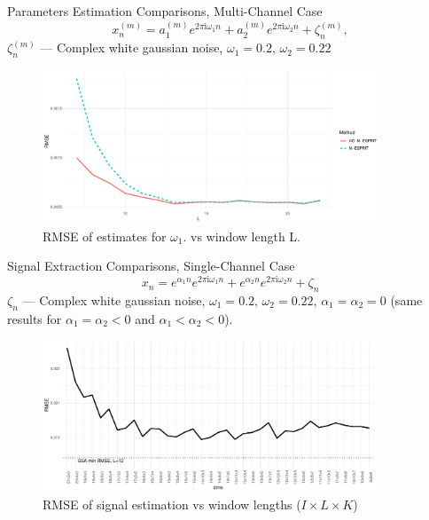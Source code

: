 \documentclass[pdf, unicode, ucs, notheorems]{beamer}
\theoremstyle{definition}
\begin{document}
\begin{frame}{Parameters Estimation Comparisons, Multi-Channel Case}
  \[
    x_{n}^{(m)} = a_1^{(m)}
    e^{2 \pi \mathrm{i} \omega_1 n} +
    a_2^{(m)}
    e^{2 \pi \mathrm{i} \omega_2 n} + \zeta_n^{(m)},
  \]
  $\zeta_n^{(m)}$ --- Complex white gaussian noise, $\omega_1 = 0.2,\,
  \omega_2 = 0.22$
  \begin{figure}[!ht]
    \centering
    \includegraphics[width=0.9\textwidth]{img/freq1_L_no_rates.pdf}
    \caption{RMSE of estimates for $\omega_1$. vs window length L.}
  \end{figure}
\end{frame}

\begin{frame}{Signal Extraction Comparisons, Single-Channel Case}
  \vspace*{-0.3cm}
  \[
    x_{n} = e^{ \alpha_1 n } e^{2 \pi\mathrm{i} \omega_1 n} +
    e^{ \alpha_2 n } e^{ 2 \pi  \mathrm{i}\omega_2 n} + \zeta_n
  \]
  $\zeta_n$ --- Complex white gaussian noise, $\omega_1 = 0.2,\,
  \omega_2 = 0.22$, $\alpha_1=\alpha_2=0$ (same results for
  $\alpha_1=\alpha_2 < 0$ and $\alpha_1 < \alpha_2 < 0$).

  \begin{figure}
    \centering
    \includegraphics[width=0.89\textwidth]{img/rec_dim_rmse_no_rates.pdf}
    \caption{RMSE of signal estimation vs window lengths
    ($I\times L \times K$)}
  \end{figure}
\end{frame}
\end{document}
